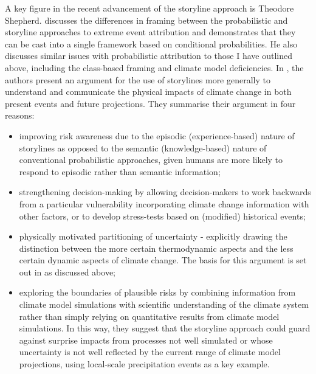     A key figure in the recent advancement of the storyline approach is Theodore Shepherd. \citet{shepherd_common_2016} discusses the differences in framing between the probabilistic and storyline approaches to extreme event attribution and demonstrates that they can be cast into a single framework based on conditional probabilities. He also discusses similar issues with probabilistic attribution to those I have outlined above, including the class-based framing and climate model deficiencies. In \citet{shepherd_storylines_2018}, the authors present an argument for the use of storylines more generally to understand and communicate the physical impacts of climate change in both present events and future projections. They summarise their argument in four reasons: 
    \begin{itemize}
      \item improving risk awareness due to the episodic (experience-based) nature of storylines as opposed to the semantic (knowledge-based) nature of conventional probabilistic approaches, given humans are more likely to respond to episodic rather than semantic information;
      \item strengthening decision-making by allowing decision-makers to work backwards from a particular vulnerability incorporating climate change information with other factors, or to develop stress-tests based on (modified) historical events;
      \item physically motivated partitioning of uncertainty - explicitly drawing the distinction between the more certain thermodynamic aspects and the less certain dynamic aspects of climate change. The basis for this argument is set out in \citet{trenberth_attribution_2015} as discussed above;
      \item exploring the boundaries of plausible risks by combining information from climate model simulations with scientific understanding of the climate system rather than simply relying on quantitative results from climate model simulations. In this way, they suggest that the storyline approach could guard against surprise impacts from processes not well simulated or whose uncertainty is not well reflected by the current range of climate model projections, using local-scale precipitation events as a key example.
    \end{itemize}

